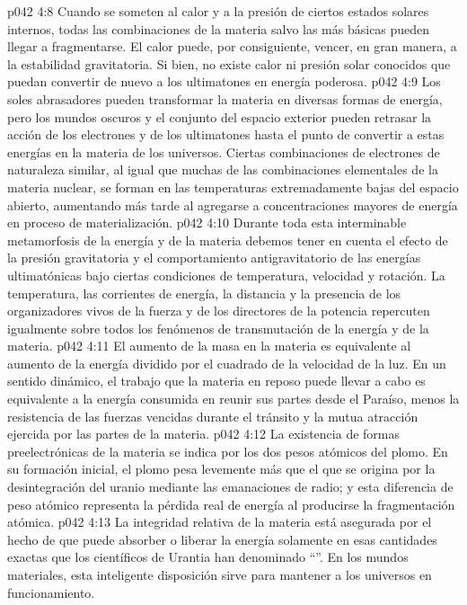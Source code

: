\vs p042 4:8 Cuando se someten al calor y a la presión de ciertos estados solares internos, todas las combinaciones de la materia salvo las más básicas pueden llegar a fragmentarse. El calor puede, por consiguiente, vencer, en gran manera, a la estabilidad gravitatoria. Si bien, no existe calor ni presión solar conocidos que puedan convertir de nuevo a los ultimatones en energía poderosa.
\vs p042 4:9 Los soles abrasadores pueden transformar la materia en diversas formas de energía, pero los mundos oscuros y el conjunto del espacio exterior pueden retrasar la acción de los electrones y de los ultimatones hasta el punto de convertir a estas energías en la materia de los universos. Ciertas combinaciones de electrones de naturaleza similar, al igual que muchas de las combinaciones elementales de la materia nuclear, se forman en las temperaturas extremadamente bajas del espacio abierto, aumentando más tarde al agregarse a concentraciones mayores de energía en proceso de materialización.
\vs p042 4:10 Durante toda esta interminable metamorfosis de la energía y de la materia debemos tener en cuenta el efecto de la presión gravitatoria y el comportamiento antigravitatorio de las energías ultimatónicas bajo ciertas condiciones de temperatura, velocidad y rotación. La temperatura, las corrientes de energía, la distancia y la presencia de los organizadores vivos de la fuerza y de los directores de la potencia repercuten igualmente sobre todos los fenómenos de transmutación de la energía y de la materia.
\vs p042 4:11 El aumento de la masa en la materia es equivalente al aumento de la energía dividido por el cuadrado de la velocidad de la luz. En un sentido dinámico, el trabajo que la materia en reposo puede llevar a cabo es equivalente a la energía consumida en reunir sus partes desde el Paraíso, menos la resistencia de las fuerzas vencidas durante el tránsito y la mutua atracción ejercida por las partes de la materia.
\vs p042 4:12 \pc La existencia de formas preelectrónicas de la materia se indica por los dos pesos atómicos del plomo. En su formación inicial, el plomo pesa levemente más que el que se origina por la desintegración del uranio mediante las emanaciones de radio; y esta diferencia de peso atómico representa la pérdida real de energía al producirse la fragmentación atómica.
\vs p042 4:13 \pc La integridad relativa de la materia está asegurada por el hecho de que puede absorber o liberar la energía solamente en esas cantidades exactas que los científicos de Urantia han denominado “”. En los mundos materiales, esta inteligente disposición sirve para mantener a los universos en funcionamiento.
